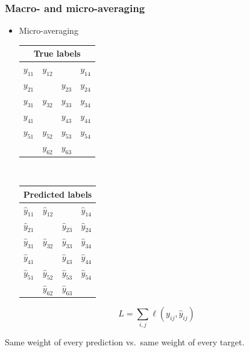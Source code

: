\documentclass[]{beamer}
\begin{document}
\begin{frame}
\frametitle{Macro- and micro-averaging}

\begin{itemize}
\item<1-> Micro-averaging

\begin{center}
\begin{tabular}{|c|c|c|c|}
\multicolumn{4}{c}{True labels} \\
\hline
\color{putred}$y_{11}$ & \color{putred}$y_{12}$ &   & \color{putred}$y_{14}$ \\
\color{putred}$y_{21}$ &   & \color{putred}$y_{23}$ & \color{putred}$y_{24}$ \\
\color{putred}$y_{31}$ & \color{putred}$y_{32}$ & \color{putred}$y_{33}$ & \color{putred}$y_{34}$ \\
\color{putred}$y_{41}$ &   & \color{putred}$y_{43}$ & \color{putred}$y_{44}$ \\
\color{putred}$y_{51}$ & \color{putred}$y_{52}$ & \color{putred}$y_{53}$ & \color{putred}$y_{54}$ \\
  & \color{putred}$y_{62}$ & \color{putred}$y_{63}$ &   \\
\hline
\end{tabular}
$\quad$
\begin{tabular}{|c|c|c|c|}
\multicolumn{4}{c}{Predicted labels} \\
\hline
\color{putred}$\hat{y}_{11}$ & \color{putred}$\hat{y}_{12}$ &   & \color{putred}$\hat{y}_{14}$ \\
\color{putred}$\hat{y}_{21}$ &   & \color{putred}$\hat{y}_{23}$ & \color{putred}$\hat{y}_{24}$ \\
\color{putred}$\hat{y}_{31}$ & \color{putred}$\hat{y}_{32}$ & \color{putred}$\hat{y}_{33}$ & \color{putred}$\hat{y}_{34}$ \\
\color{putred}$\hat{y}_{41}$ &   & \color{putred}$\hat{y}_{43}$ & \color{putred}$\hat{y}_{44}$ \\
\color{putred}$\hat{y}_{51}$ & \color{putred}$\hat{y}_{52}$ & \color{putred}$\hat{y}_{53}$ & \color{putred}$\hat{y}_{54}$ \\
  & \color{putred}$\hat{y}_{62}$ & \color{putred}$\hat{y}_{63}$ &   \\
\hline
\end{tabular}
\end{center}
\end{itemize}

$$
L =  \sum_{i,j} \ell(y_{ij} , \hat{y}_{ij})
$$
\begin{center}
Same weight of every prediction vs.\ same weight of every target.
\end{center}

\end{frame}
\end{document}
